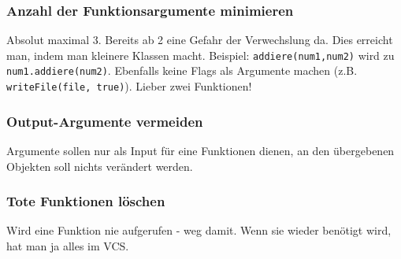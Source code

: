 \subsubsection{Anzahl der Funktionsargumente minimieren}
Absolut maximal 3. Bereits ab 2 eine Gefahr der Verwechslung da. Dies erreicht man, indem man kleinere Klassen macht. Beispiel: \texttt{addiere(num1,num2)} wird zu \texttt{num1.addiere(num2)}. Ebenfalls keine Flags als Argumente machen (z.B. \texttt{writeFile(file, true)}). Lieber zwei Funktionen!

\subsubsection{Output-Argumente vermeiden}
Argumente sollen nur als Input für eine Funktionen dienen, an den übergebenen Objekten soll nichts verändert werden.

\subsubsection{Tote Funktionen löschen}
Wird eine Funktion nie aufgerufen - weg damit. Wenn sie wieder benötigt wird, hat man ja alles im VCS.